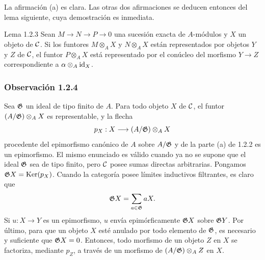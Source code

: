 \begin{prooftext}[Demostración]
La afirmación (a) es clara. Las otras dos afirmaciones se deducen entonces del lema siguiente, cuya demostración es inmediata.
\end{prooftext}

\begin{statement}{Lema 1.2.3}
Sean $M\to N\to P\to0$ una sucesión exacta de $A$-módulos y $X$ un objeto de $\mathcal C$. Si los funtores $M\otimes_A X$ y $N\otimes_A X$ están representados por objetos $Y$ y $Z$ de $\mathcal C$, el funtor $P\otimes_A X$ está representado por el conúcleo del morfismo $Y\to Z$ correspondiente a $\alpha\otimes_A\operatorname{id}_X$.
\end{statement}

\subsubsection*{Observación 1.2.4}
Sea $\mathfrak G$ un ideal de tipo finito de $A$. Para todo objeto $X$ de $\mathcal C$, el funtor $(A/\mathfrak G)\otimes_A X$ es representable, y la flecha
\[
p_X:X\longrightarrow (A/\mathfrak G)\otimes_A X
\]
procedente del epimorfismo canónico de $A$ sobre $A/\mathfrak G$ y de la parte (a) de 1.2.2 es un epimorfismo. El mismo enunciado es válido cuando ya no se supone que el ideal $\mathfrak G$ sea de tipo finito, pero $\mathcal C$ posee sumas directas arbitrarias. Pongamos $\mathfrak G X=\operatorname{Ker}(p_X)$. Cuando la categoría posee límites inductivos filtrantes, es claro que
\[
\mathfrak G X=\sum_{a\in\mathfrak G}aX.
\]
Si $u:X\to Y$ es un epimorfismo, $u$ envía epimórficamente $\mathfrak G X$ sobre $\mathfrak G Y$. Por último, para que un objeto $X$ esté anulado por todo elemento de $\mathfrak G$, es necesario y suficiente que $\mathfrak G X=0$. Entonces, todo morfismo de un objeto $Z$ en $X$ se factoriza, mediante $p_Z$, a través de un morfismo de $(A/\mathfrak G)\otimes_A Z$ en $X$.
